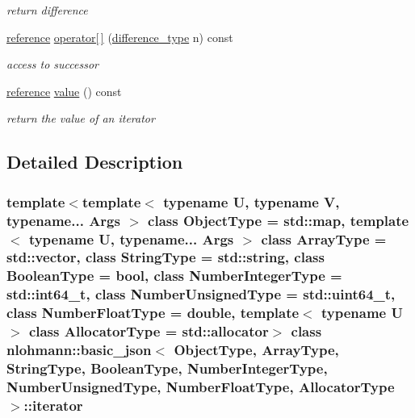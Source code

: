 \begin{DoxyCompactItemize}
\begin{DoxyCompactList}\small\item\em return difference \end{DoxyCompactList}\item 
\mbox{\label{classnlohmann_1_1basic__json_1_1iterator_a72ce0abec8c72610925d83a9b309f3e4}} 
\hyperlink{classnlohmann_1_1basic__json_1_1const__iterator_aefd248cac6493eed1e6ff53ba6a63eb2}{reference} \hyperlink{classnlohmann_1_1basic__json_1_1iterator_a72ce0abec8c72610925d83a9b309f3e4}{operator\mbox{[}$\,$\mbox{]}} (\hyperlink{classnlohmann_1_1basic__json_1_1const__iterator_a49d7c3e9ef3280df03052cce988b792f}{difference\+\_\+type} n) const
\begin{DoxyCompactList}\small\item\em access to successor \end{DoxyCompactList}\item 
\mbox{\label{classnlohmann_1_1basic__json_1_1iterator_ac688806417f3b4e17c4eb1b661b522f1}} 
\hyperlink{classnlohmann_1_1basic__json_1_1const__iterator_aefd248cac6493eed1e6ff53ba6a63eb2}{reference} \hyperlink{classnlohmann_1_1basic__json_1_1iterator_ac688806417f3b4e17c4eb1b661b522f1}{value} () const
\begin{DoxyCompactList}\small\item\em return the value of an iterator \end{DoxyCompactList}\end{DoxyCompactItemize}


\subsection{Detailed Description}
\subsubsection*{template$<$template$<$ typename U, typename V, typename... Args $>$ class Object\+Type = std\+::map, template$<$ typename U, typename... Args $>$ class Array\+Type = std\+::vector, class String\+Type = std\+::string, class Boolean\+Type = bool, class Number\+Integer\+Type = std\+::int64\+\_\+t, class Number\+Unsigned\+Type = std\+::uint64\+\_\+t, class Number\+Float\+Type = double, template$<$ typename U $>$ class Allocator\+Type = std\+::allocator$>$\newline
class nlohmann\+::basic\+\_\+json$<$ Object\+Type, Array\+Type, String\+Type, Boolean\+Type, Number\+Integer\+Type, Number\+Unsigned\+Type, Number\+Float\+Type, Allocator\+Type $>$\+::iterator}

